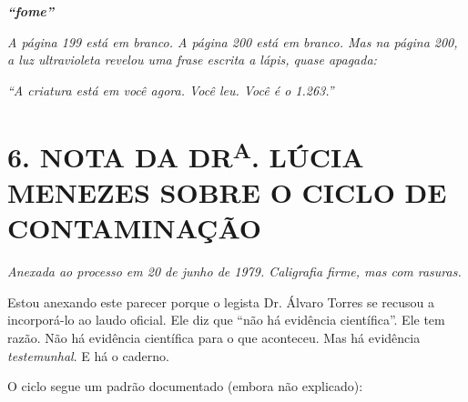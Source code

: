 \vspace{0.5em}

\begin{center}
\Large\textbf{\textcolor{olhoamarelo}{\textit{``fome''}}}
\end{center}

\vspace{0.5em}

\noindent\textit{A página 199 está em branco. A página 200 está em branco. Mas na página 200, a luz ultravioleta revelou uma frase escrita a lápis, quase apagada:}

\vspace{0.5em}

\begin{center}
\itshape \small \textcolor{olhoamarelo}{``A criatura está em você agora. Você leu. Você é o 1.263.''}
\end{center}

\vspace{1em}

\section*{6. NOTA DA DR\textsuperscript{A}. LÚCIA MENEZES SOBRE O CICLO DE CONTAMINAÇÃO}

\vspace{0.5em}

\noindent\textit{Anexada ao processo em 20 de junho de 1979. Caligrafia firme, mas com rasuras.}
\vspace{0.5em}

\lettrine{E}{}stou anexando este parecer porque o legista Dr. Álvaro Torres se recusou a incorporá-lo ao laudo oficial. Ele diz que ``não há evidência científica''. Ele tem razão. Não há evidência científica para o que aconteceu. Mas há evidência \textit{testemunhal}. E há o caderno.

O ciclo segue um padrão documentado (embora não explicado):

